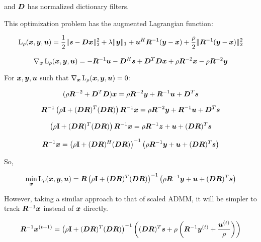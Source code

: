and $\bm{D}$ has normalized dictionary filters.

This optimization problem has the augmented Lagrangian function:

\begin{equation}
\operatorname{L}_{\rho}(\bm{x},\bm{y},\bm{u}) = \frac{1}{2}\|\bm{s} - \bm{D}\bm{x}\|_2^2 + \lambda\|\bm{y}\|_1 + \bm{u}^H\bm{R}^{-1}(\bm{y} - \bm{x})  + \frac{\rho}{2}\|\bm{R}^{-1}(\bm{y} - \bm{x})\|_2^2
\end{equation} 

\begin{equation}
\nabla_{\bm{x}}\operatorname{L}_{\rho}(\bm{x},\bm{y},\bm{u}) = -\bm{R}^{-1}\bm{u} - \bm{D}^H\bm{s} + \bm{D}^T\bm{D}\bm{x} + \rho\bm{R}^{-2}\bm{x} - \rho\bm{R}^{-2}\bm{y}
\end{equation}

For $\bm{x},\bm{y},\bm{u}$ such that $\nabla_{\bm{x}}\operatorname{L}_{\rho}(\bm{x},\bm{y},\bm{u}) = 0$:

\begin{equation}
(\rho\bm{R}^{-2} + \bm{D}^T\bm{D})\bm{x} = \rho\bm{R}^{-2}\bm{y} + \bm{R}^{-1} \bm{u} + \bm{D}^T\bm{s}
\end{equation}

\begin{equation}
\bm{R}^{-1}\left(\rho{\bf I} + (\bm{D}\bm{R})^T(\bm{D}\bm{R})\right)\bm{R}^{-1}\bm{x} = \rho\bm{R}^{-2}\bm{y} + \bm{R}^{-1}\bm{u} + \bm{D}^T\bm{s}
\end{equation}

\begin{equation}
\left(\rho{\bf I} + (\bm{D}\bm{R})^T(\bm{D}\bm{R})\right)\bm{R}^{-1}\bm{x} = \rho\bm{R}^{-1}\bm{z} + \bm{u} + (\bm{D}\bm{R})^T\bm{s}
\end{equation}

\begin{equation}
\bm{R}^{-1}\bm{x} = \left(\rho{\bf I} + (\bm{D}\bm{R})^H(\bm{D}\bm{R})\right)^{-1}\left(\rho\bm{R}^{-1}\bm{y} + \bm{u} + (\bm{D}\bm{R})^T\bm{s}\right)
\end{equation}

So,

\begin{equation}
\min_{\bm{x}} \operatorname{L}_{\rho}(\bm{x},\bm{y},\bm{u}) = \bm{R}\left(\rho{\bf I} + (\bm{D}\bm{R})^T(\bm{D}\bm{R})\right)^{-1}\left(\rho\bm{R}^{-1}\bm{y} + \bm{u} + (\bm{D}\bm{R})^T\bm{s}\right)
\end{equation}

However, taking a similar approach to that of scaled ADMM, it will be simpler to track $\bm{R}^{-1}\bm{x}$ instead of $\bm{x}$ directly.

\begin{equation}
\bm{R}^{-1}\bm{x}^{(t + 1)} = \left(\rho{\bf I} + (\bm{D}\bm{R})^T(\bm{D}\bm{R})\right)^{-1}\left((\bm{D}\bm{R})^T\bm{s} + \rho\left(\bm{R}^{-1}\bm{y}^{(t)} + \frac{\bm{u}^{(t)}}{\rho}\right)\right)
\end{equation}

